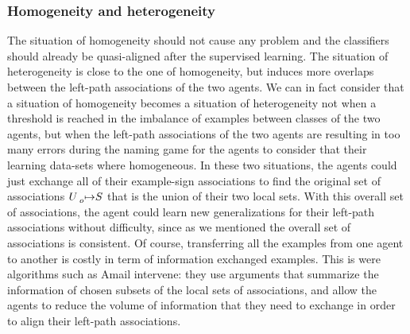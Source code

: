 \subsubsection{Homogeneity and heterogeneity} The situation of homogeneity should not cause any problem and the classifiers should already be quasi-aligned after the supervised learning. The situation of heterogeneity is close to the one of homogeneity, but induces more overlaps between the left-path associations of the two agents. We can in fact consider that a situation of homogeneity becomes a situation of heterogeneity not when a threshold is reached in the imbalance of examples between classes of the two agents, but when the left-path associations of the two agents are resulting in too many errors during the naming game for the agents to consider that their learning data-sets where homogeneous. In these two situations, the agents could just exchange all of their example-sign associations to find the original set of associations $U \prescript{}{o}{\mapsto} S$ that is the union of their two local sets. With this overall set of associations, the agent could learn new generalizations for their left-path associations without difficulty, since as we mentioned the overall set of associations is consistent. Of course, transferring all the examples from one agent to another is costly in term of information exchanged examples. This is were algorithms such as Amail intervene: they use arguments that summarize the information of chosen subsets of the local sets of associations, and allow the agents to reduce the volume of information that they need to exchange in order to align their left-path associations.

